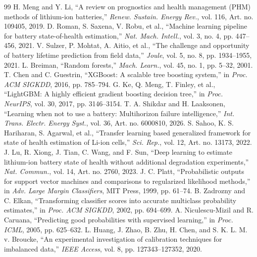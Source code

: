 \documentclass[preprint,12pt]{elsarticle}
\begin{document}
\raggedbottom
\clearpage

\begin{thebibliography}{99}
 H. Meng and Y. Li, ``A review on prognostics and health management (PHM) methods of lithium-ion batteries,'' \emph{Renew. Sustain. Energy Rev.}, vol. 116, Art. no. 109405, 2019.
 D. Roman, S. Saxena, V. Robu, et al., ``Machine learning pipeline for battery state-of-health estimation,'' \emph{Nat. Mach. Intell.}, vol. 3, no. 4, pp. 447--456, 2021.
 V. Sulzer, P. Mohtat, A. Aitio, et al., ``The challenge and opportunity of battery lifetime prediction from field data,'' \emph{Joule}, vol. 5, no. 8, pp. 1934--1955, 2021.
 L. Breiman, ``Random forests,'' \emph{Mach. Learn.}, vol. 45, no. 1, pp. 5--32, 2001.
 T. Chen and C. Guestrin, ``XGBoost: A scalable tree boosting system,'' in \emph{Proc. ACM SIGKDD}, 2016, pp. 785--794.
 G. Ke, Q. Meng, T. Finley, et al., ``LightGBM: A highly efficient gradient boosting decision tree,'' in \emph{Proc. NeurIPS}, vol. 30, 2017, pp. 3146--3154.
 T. A. Shikdar and H. Laaksonen, ``Learning when not to use a battery: Multihorizon failure intelligence,'' \emph{Int. Trans. Electr. Energy Syst.}, vol. 36, Art. no. 6000810, 2026.
 S. Sahoo, K. S. Hariharan, S. Agarwal, et al., ``Transfer learning based generalized framework for state of health estimation of Li-ion cells,'' \emph{Sci. Rep.}, vol. 12, Art. no. 13173, 2022.
 J. Lu, R. Xiong, J. Tian, C. Wang, and F. Sun, ``Deep learning to estimate lithium-ion battery state of health without additional degradation experiments,'' \emph{Nat. Commun.}, vol. 14, Art. no. 2760, 2023.
 J. C. Platt, ``Probabilistic outputs for support vector machines and comparisons to regularized likelihood methods,'' in \emph{Adv. Large Margin Classifiers}, MIT Press, 1999, pp. 61--74.
 B. Zadrozny and C. Elkan, ``Transforming classifier scores into accurate multiclass probability estimates,'' in \emph{Proc. ACM SIGKDD}, 2002, pp. 694--699.
 A. Niculescu-Mizil and R. Caruana, ``Predicting good probabilities with supervised learning,'' in \emph{Proc. ICML}, 2005, pp. 625--632.
 L. Huang, J. Zhao, B. Zhu, H. Chen, and S. K. L. M. v. Broucke, ``An experimental investigation of calibration techniques for imbalanced data,'' \emph{IEEE Access}, vol. 8, pp. 127343--127352, 2020.

\end{thebibliography}
\end{document}
